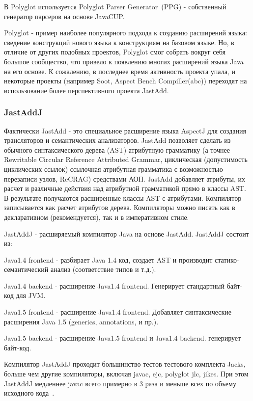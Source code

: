 \documentclass[a4paper,12pt]{article}
\begin{document}
В Polyglot используется Polyglot Parser Generator~(PPG) - собственный генератор
парсеров на основе JavaCUP.

Polyglot - пример наиболее популярного подхода к созданию расширений языка:
сведение конструкций нового языка к конструкциям на базовом языке. Но, в
отличие от других подобных проектов, Polyglot смог собрать вокруг себя большое
сообщество, что привело к появлению многих расширений языка Java на его основе.
К сожалению, в последнее время активность проекта упала, и некоторые проекты
(например Soot, Aspect Bench Compiller(abc)) переходят на использование более
перспективного проекта JastAdd.

\subsubsection{JastAddJ}
Фактически JastAdd - это специальное расширение языка AspectJ для создания
трансляторов и семантических анализаторов. JastAdd позволяет сделать из
обычного синтаксического дерева (AST) атрибутную грамматику (а точнее
Rewritable Circular Reference Attributed Grammar, циклическая (допустимость
циклических ссылок) ссылочная атрибутная грамматика с возможностью перезаписи
узлов, ReCRAG) средствами АОП. JastAdd добавляет атрибуты, их расчет и
различные действия над атрибутной грамматикой прямо в классы AST. В результате
получаются расширенные классы AST с атрибутами. Компилятор записывается как
расчет атрибутов дерева. Компиляторы можно писать как в декларативном
(рекомендуется), так и в императивном стиле.

JastAddJ - расширяемый компилятор Java на основе JastAdd.
JastAddJ состоит из:

Java1.4 frontend - разбирает Java 1.4 код, создает AST и производит
статико-семантический анализ (соответствие типов и т.д.).

Java1.4 backend - расширение Java1.4 frontend. Генерирует стандартный байт-код
для JVM.

Java1.5 frontend - расширение Java1.4 frontend. Добавляет синтаксические
расширения Java 1.5 (generics, annotations, и пр.).

Java1.5 backend - расширение Java1.5 frontend и Java1.4 backend. генерирует
байт-код.

Компилятор JastAddJ проходит большинство тестов тестового комплекта Jacks,
больше чем другие компиляторы, включая javac, ejc, polyglot jlc, jikes. При
этом JastAddJ медленнее javac всего примерно в 3 раза и меньше всех по объему
исходного кода~\cite{JastAddJ}.
\end{document}
